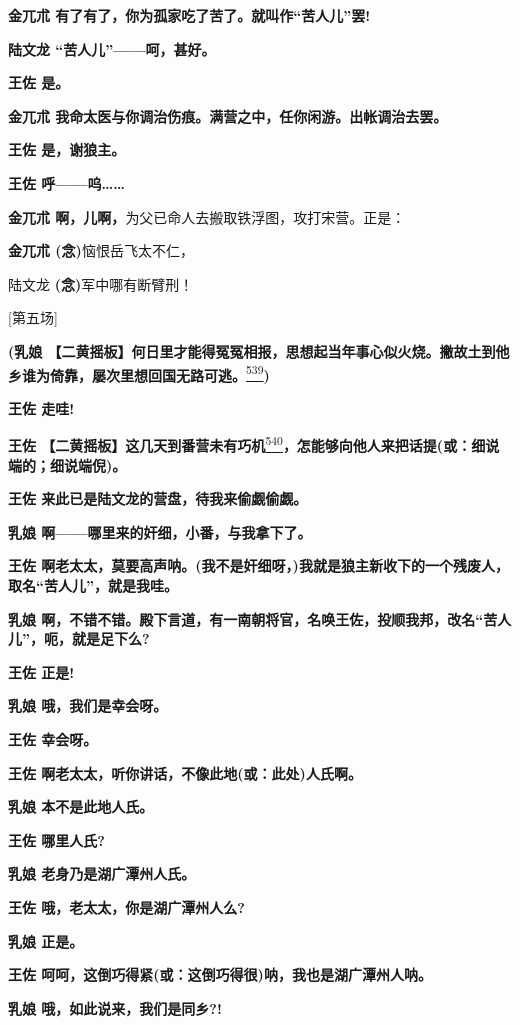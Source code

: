 \textbf{金兀朮 有了有了，你为孤家吃了苦了。就叫作``苦人儿''罢!}

\textbf{陆文龙 ``苦人儿''------呵，甚好。}

\textbf{王佐 是。}

\textbf{金兀朮 我命太医与你调治伤痕。满营之中，任你闲游。出帐调治去罢。}

\textbf{王佐 是，谢狼主。}

\textbf{王佐 呼------呜\ldots{}\ldots{}}

\textbf{金兀朮 啊，儿啊，}为父已命人去搬取铁浮图，攻打宋营。正是：

\textbf{金兀朮 (念)}恼恨岳飞太不仁，

陆文龙 \textbf{(念)}军中哪有断臂刑！

{[}第五场{]}

\textbf{(乳娘
【二黄摇板】何日里才能得冤冤相报，思想起当年事心似火烧。撇故土到他乡谁为倚靠，屡次里想回国无路可逃。}\protect\hyperlink{fn539}{\textsuperscript{539}}\textbf{)}

\textbf{王佐 走哇!}

\textbf{王佐
【二黄摇板】这几天到番营未有巧机}\protect\hyperlink{fn540}{\textsuperscript{540}}\textbf{，怎能够向他人来把话提(或：细说端的；细说端倪)。}

\textbf{王佐 来此已是陆文龙的营盘，待我来偷觑偷觑。}

\textbf{乳娘 啊------哪里来的奸细，小番，与我拿下了。}

\textbf{王佐
啊老太太，莫要高声呐。(我不是奸细呀，)我就是狼主新收下的一个残废人，
取名``苦人儿''，就是我哇。}

\textbf{乳娘
啊，不错不错。殿下言道，有一南朝将官，名唤王佐，投顺我邦，改名``苦人
儿''，呃，就是足下么?}

\textbf{王佐 正是!}

\textbf{乳娘 哦，我们是幸会呀。}

\textbf{王佐 幸会呀。}

\textbf{王佐 啊老太太，听你讲话，不像此地(或：此处)人氏啊。}

\textbf{乳娘 本不是此地人氏。}

\textbf{王佐 哪里人氏?}

\textbf{乳娘 老身乃是湖广潭州人氏。}

\textbf{王佐 哦，老太太，你是湖广潭州人么?}

\textbf{乳娘 正是。}

\textbf{王佐 呵呵，这倒巧得紧(或：这倒巧得很)呐，我也是湖广潭州人呐。}

\textbf{乳娘 哦，如此说来，我们是同乡?!}


